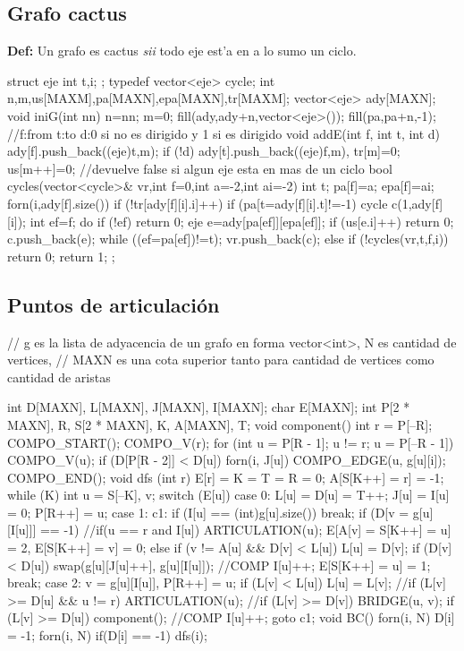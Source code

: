 \documentclass[10pt,landscape,twocolumn,a4paper,notitlepage]{article}
\begin{document}
\subsection{Grafo cactus}
\textbf{Def:} Un grafo es cactus \textit{sii} todo eje est'a en a lo sumo un ciclo.
\begin{code}
struct eje { int t,i; };
typedef vector<eje> cycle;
int n,m,us[MAXM],pa[MAXN],epa[MAXN],tr[MAXM];
vector<eje> ady[MAXN];
void iniG(int nn) { n=nn; m=0; fill(ady,ady+n,vector<eje>());
fill(pa,pa+n,-1); }
//f:from t:to d:0 si no es dirigido y 1 si es dirigido
void addE(int f, int t, int d) {
  ady[f].push_back((eje){t,m});
  if (!d) ady[t].push_back((eje){f,m}), tr[m]=0;
  us[m++]=0;
}
//devuelve false si algun eje esta en mas de un ciclo
bool cycles(vector<cycle>& vr,int f=0,int a=-2,int ai=-2) {
  int t; pa[f]=a; epa[f]=ai;
  forn(i,ady[f].size()) if (!tr[ady[f][i].i]++) if (pa[t=ady[f][i].t]!=-1) {
    cycle c(1,ady[f][i]); int ef=f;
    do {
      if (!ef) return 0;
      eje e=ady[pa[ef]][epa[ef]];
      if (us[e.i]++) return 0;
      c.push_back(e);
    } while ((ef=pa[ef])!=t);
    vr.push_back(c);
  } else if (!cycles(vr,t,f,i)) return 0;
  return 1;
};
\end{code}
\subsection{Puntos de articulaci\'on}
\begin{code}
// g es la lista de adyacencia de un grafo en forma vector<int>, N es cantidad de vertices,
// MAXN es una cota superior tanto para cantidad de vertices como cantidad de aristas

int D[MAXN], L[MAXN], J[MAXN], I[MAXN]; char E[MAXN];
int P[2 * MAXN], R, S[2 * MAXN], K, A[MAXN], T;
void component() {
    int r = P[--R]; COMPO_START(); COMPO_V(r);
    for (int u = P[R - 1]; u != r; u = P[--R - 1]) {
        COMPO_V(u);
        if (D[P[R - 2]] < D[u]) forn(i, J[u]) COMPO_EDGE(u, g[u][i]);
    } COMPO_END();
}
void dfs (int r) {
    E[r] = K = T = R = 0; A[S[K++] = r] = -1;
    while (K) { int u = S[--K], v;
        switch (E[u]) {
        case 0: L[u] = D[u] = T++; J[u] = I[u] = 0; P[R++] = u;
        case 1: c1: if (I[u] == (int)g[u].size()) break;
            if (D[v = g[u][I[u]]] == -1) {
                //if(u == r and I[u]) ARTICULATION(u);
                E[A[v] = S[K++] = u] = 2, E[S[K++] = v] = 0;
            } else { if (v != A[u] && D[v] < L[u]) L[u] = D[v];
                if (D[v] < D[u]) swap(g[u][J[u]++], g[u][I[u]]); //COMP
                I[u]++; E[S[K++] = u] = 1;
            } break;
        case 2: v = g[u][I[u]], P[R++] = u;
            if (L[v] < L[u]) L[u] = L[v];
            //if (L[v] >= D[u] && u != r) ARTICULATION(u);
            //if (L[v] >= D[v]) BRIDGE(u, v);
            if (L[v] >= D[u]) component(); //COMP
            I[u]++; goto c1;
        }
    }
}
void BC() {
    forn(i, N) D[i] = -1;
    forn(i, N) if(D[i] == -1) dfs(i);
}
\end{code}
\end{document}
